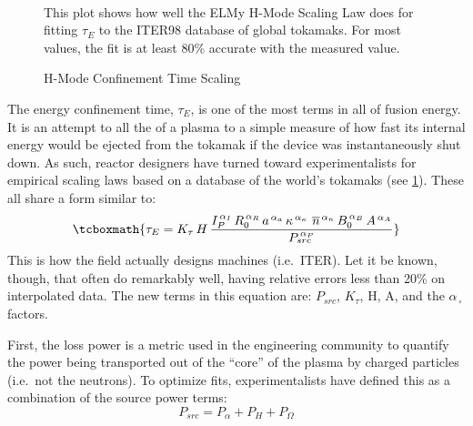 \begin{figure}
	\centering
	\begin{adjustbox}{width=0.75\textwidth}
		
	\end{adjustbox}
	\caption{H-Mode Confinement Time Scaling} ~\\
	\small This plot shows how well the ELMy H-Mode Scaling Law does for fitting $\tau_E$ to the ITER98 database of global tokamaks. For most values, the fit is at least 80\% accurate with the measured value.\cite{tau_iter}
	\label{fig:elmy}
\end{figure}

The energy confinement time, $\tau_E$, is one of the most  terms in all of fusion energy. It is an attempt to  all the  of a plasma to a simple measure of how fast its internal energy would be ejected from the tokamak if the device was instantaneously shut down. As such, reactor designers have turned toward experimentalists for empirical scaling laws based on a database of the world's tokamaks (see \cref{fig:elmy}). These all share a form similar to:
\begin{equation}
	\tcboxmath{
	\tau_E = K_\tau \, H \, \frac{
		I_P^{\,\alpha_I} \, R_0^{\,\alpha_R} \, a^{\,\alpha_a} \, \kappa^{\,\alpha_\kappa} \ \overline{n}^{\,\alpha_n} \, B_0^{\,\alpha_B} \, A^{\,\alpha_A}
	}{ P_{src} ^ {\,\alpha_P} }
	}
	\label{eq:tau_gen}
\end{equation}
This  is how the field actually designs machines (i.e.\ ITER).\cite{iter_confinement} Let it be known, though, that  often do remarkably well, having relative errors less than 20\% on interpolated data.\cite{tau_iter} The new terms in this equation are: $P_{src}$, $K_\tau$, H, A, and the $\alpha_{\,\square}$ factors.

First, the loss power is a metric used in the engineering community to quantify the power being transported out of the ``core'' of the plasma by charged particles (i.e.\ not the neutrons). \cite{process} To optimize fits, experimentalists have defined this as a combination of the source power terms:
\begin{equation}
	\label{eq:pl}
	P_{src} = P_\alpha + P_H + P_\Omega
\end{equation}


